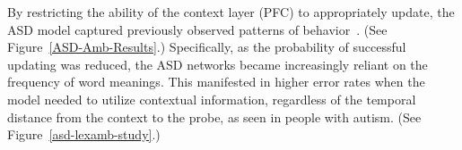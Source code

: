 By restricting the ability of the context layer (PFC) to appropriately update, the ASD model captured previously observed patterns of behavior~\cite{HappeF:1997:WCC_Homographs}. (See Figure~\ref{ASD-Amb-Results}.) Specifically, as the probability of successful updating was reduced, the ASD networks became increasingly reliant on the frequency of word meanings. This manifested in higher error rates when the model needed to utilize contextual information, regardless of the temporal distance from the context to the probe, as seen in people with autism. (See Figure~\ref{asd-lexamb-study}.) 


